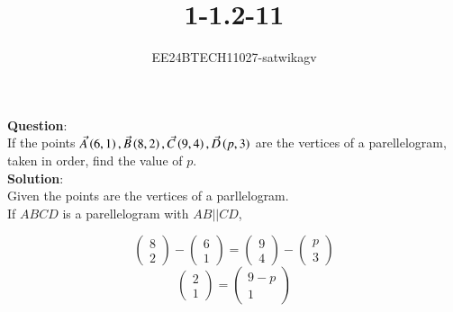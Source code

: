 \documentclass[journal]{IEEEtran}
\begin{document}

\vspace{3cm}

\title{1-1.2-11}
\author{EE24BTECH11027-satwikagv}
{\let\newpage\relax\maketitle}

\renewcommand{\thefigure}{\theenumi}
\renewcommand{\thetable}{\theenumi}
\setlength{\intextsep}{10pt} %


\renewcommand{\thetable}{\theenumi}
\textbf{Question}:\\
If the points $\Vec{A}\left(6,1\right),\Vec{B}\left(8,2\right),\Vec{C}\left(9,4\right),\Vec{D}\left(p,3\right)$ are the vertices of a parellelogram, taken in order, find the value of $p$.\\
\textbf{Solution}:\\Given the points are the vertices of a parllelogram. \\If $ABCD$ is a parellelogram with $AB||CD$,\\

\[
\begin{pmatrix}
8  \\
2 
\end{pmatrix}
-
\begin{pmatrix}
6  \\
1 
\end{pmatrix}
=
\begin{pmatrix}
9  \\
4 
\end{pmatrix}
-
\begin{pmatrix}
p  \\
3 
\end{pmatrix}
\]
\[
\begin{pmatrix}
2 \\
1
\end{pmatrix}
=
\begin{pmatrix}
9-p \\
1
\end{pmatrix}
\]
\end{document}
